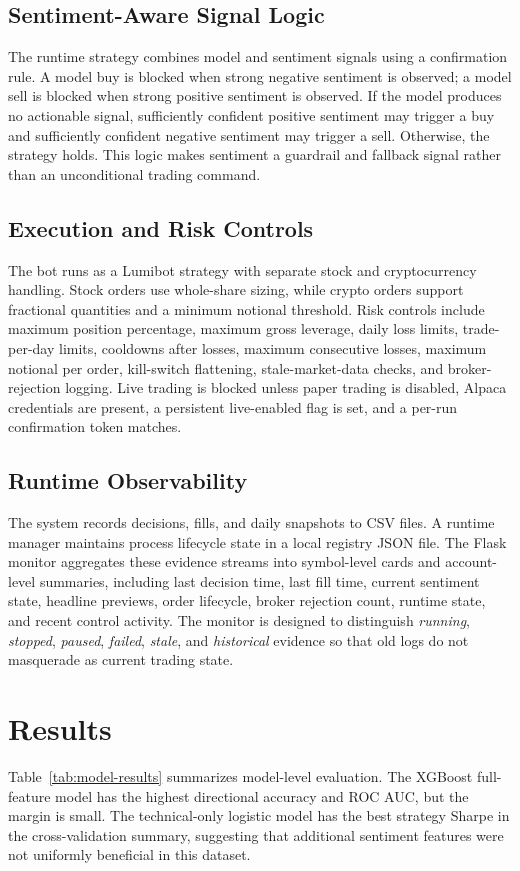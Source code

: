 \documentclass[sigconf,nonacm]{acmart}
\begin{document}
\subsection{Sentiment-Aware Signal Logic}
The runtime strategy combines model and sentiment signals using a confirmation rule. A model buy is blocked when strong negative sentiment is observed; a model sell is blocked when strong positive sentiment is observed. If the model produces no actionable signal, sufficiently confident positive sentiment may trigger a buy and sufficiently confident negative sentiment may trigger a sell. Otherwise, the strategy holds. This logic makes sentiment a guardrail and fallback signal rather than an unconditional trading command.

\subsection{Execution and Risk Controls}
The bot runs as a Lumibot strategy with separate stock and cryptocurrency handling. Stock orders use whole-share sizing, while crypto orders support fractional quantities and a minimum notional threshold. Risk controls include maximum position percentage, maximum gross leverage, daily loss limits, trade-per-day limits, cooldowns after losses, maximum consecutive losses, maximum notional per order, kill-switch flattening, stale-market-data checks, and broker-rejection logging. Live trading is blocked unless paper trading is disabled, Alpaca credentials are present, a persistent live-enabled flag is set, and a per-run confirmation token matches.

\subsection{Runtime Observability}
The system records decisions, fills, and daily snapshots to CSV files. A runtime manager maintains process lifecycle state in a local registry JSON file. The Flask monitor aggregates these evidence streams into symbol-level cards and account-level summaries, including last decision time, last fill time, current sentiment state, headline previews, order lifecycle, broker rejection count, runtime state, and recent control activity. The monitor is designed to distinguish \emph{running}, \emph{stopped}, \emph{paused}, \emph{failed}, \emph{stale}, and \emph{historical} evidence so that old logs do not masquerade as current trading state.

\section{Results}
Table~\ref{tab:model-results} summarizes model-level evaluation. The XGBoost full-feature model has the highest directional accuracy and ROC AUC, but the margin is small. The technical-only logistic model has the best strategy Sharpe in the cross-validation summary, suggesting that additional sentiment features were not uniformly beneficial in this dataset.
\end{document}

